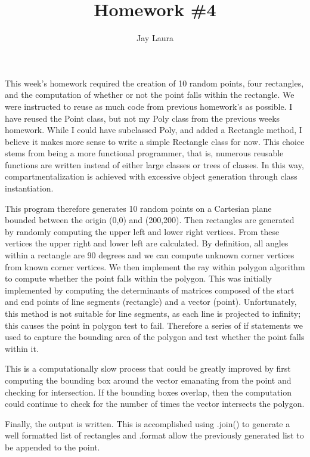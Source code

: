 \documentclass[11pt]{article}
\begin{document}
\title{Homework \#4}
\author{Jay Laura}
\date{}
\maketitle

This week's homework required the creation of 10 random points, four rectangles, and the computation  of whether or not the point falls within the rectangle.  We were instructed to reuse as much code from previous homework's as possible.  I have reused the Point class, but not my Poly class from the previous weeks homework.  While I could have subclassed Poly, and added a Rectangle method, I believe it makes more sense to write a simple Rectangle class for now.  This choice stems from being a more functional programmer, that is, numerous reusable functions are written instead of either large classes or trees of classes.  In this way, compartmentalization is achieved with excessive object generation through class instantiation.

This program therefore generates 10 random points on a Cartesian plane bounded between the origin (0,0) and (200,200).  Then rectangles are generated by randomly computing the upper left and lower right vertices.  From these vertices the upper right and lower left are calculated.  By definition, all angles within a rectangle are 90 degrees and we can compute unknown corner vertices from known corner vertices.  We then implement the ray within polygon algorithm to compute whether the point falls within the polygon.  This was initially implemented by computing the determinants of matrices composed of the start and end points of line segments (rectangle) and a vector (point).  Unfortunately, this method is not suitable for line segments, as each line is projected to infinity; this causes the point in polygon test to fail.   Therefore a series of if statements we used to capture the bounding area of the polygon and test whether the point falls within it.

This is a computationally slow process that could be greatly improved by first computing the bounding box around the vector emanating from the point and checking for intersection.  If the bounding boxes overlap, then the computation could continue to check for the number of times the vector intersects the polygon. 

Finally, the output is written.  This is accomplished using .join() to generate a well formatted list of rectangles and .format allow the previously generated list to be appended to the point.
\end{document}
